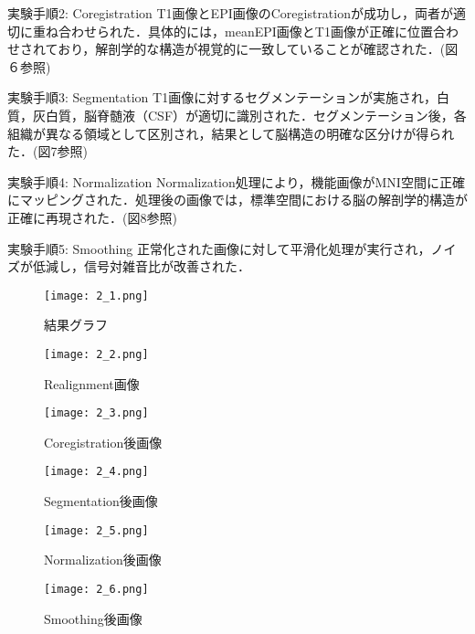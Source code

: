 \documentclass{jlreq}
\begin{document}
実験手順2: Coregistration
T1画像とEPI画像のCoregistrationが成功し，両者が適切に重ね合わせられた．具体的には，meanEPI画像とT1画像が正確に位置合わせされており，解剖学的な構造が視覚的に一致していることが確認された．(図６参照)


実験手順3: Segmentation
T1画像に対するセグメンテーションが実施され，白質，灰白質，脳脊髄液（CSF）が適切に識別された．セグメンテーション後，各組織が異なる領域として区別され，結果として脳構造の明確な区分けが得られた．(図7参照)

実験手順4: Normalization
Normalization処理により，機能画像がMNI空間に正確にマッピングされた．処理後の画像では，標準空間における脳の解剖学的構造が正確に再現された．(図8参照)

実験手順5: Smoothing 
正常化された画像に対して平滑化処理が実行され，ノイズが低減し，信号対雑音比が改善された．


\begin{figure}[H]
    \centering
        \begin{minipage}{0.45\textwidth}
        \centering
        \texttt{[image: 2\_1.png]}
        \caption{結果グラフ}
        \label{fig:brain_T1}
    \end{minipage}
    \hfill
    \begin{minipage}{0.45\textwidth}
        \centering
        \texttt{[image: 2\_2.png]}
        \caption{Realignment画像}
        \label{fig:brain_T1}
    \end{minipage}
    \hfill
\end{figure}


\begin{figure}[h]
    \centering
        \begin{minipage}{0.45\textwidth}
        \centering
        \texttt{[image: 2\_3.png]}
        \caption{Coregistration後画像}
        \label{fig:brain_T1}
    \end{minipage}
    \hfill
    \begin{minipage}{0.45\textwidth}
        \centering
        \texttt{[image: 2\_4.png]}
        \caption{Segmentation後画像}
        \label{fig:brain_T1}
    \end{minipage}
    \hfill
\end{figure}

\begin{figure}[H]
    \centering
        \begin{minipage}{0.45\textwidth}
        \centering
        \texttt{[image: 2\_5.png]}
        \caption{Normalization後画像}
        \label{fig:brain_T1}
    \end{minipage}
    \hfill
    \begin{minipage}{0.45\textwidth}
        \centering
        \texttt{[image: 2\_6.png]}
        \caption{Smoothing後画像}
        \label{fig:brain_T1}
    \end{minipage}
    \hfill
\end{figure}
\end{document}
